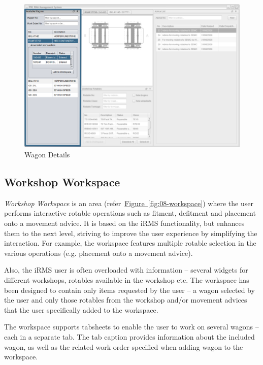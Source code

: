 \begin{figure}[!h]
\centering
\includegraphics[scale=0.37]{chapters/01-user-interface/images/03-available-wagons-expanded.png}
\caption{Wagon Details}\label{fig:03-available-wagons-expanded}
\end{figure}

\clearpage

\subsection{Workshop Workspace}

\emph{Workshop Workspace} is an area (refer~\hyperref[fig:08-workspace]{Figure~\ref*{fig:08-workspace}}) where the user performs interactive rotable operations such as fitment, defitment and placement onto a movement advice. It is based on the iRMS functionality, but enhances them to the next level, striving to improve the user experience by simplifying the interaction. For example, the workspace features multiple rotable selection in the various operations (e.g. placement onto a movement advice).

Also, the iRMS user is often overloaded with information -- several widgets for different workshops, rotables available in the workshop etc. The workspace has been designed to contain only items requested by the user -- a wagon selected by the user and only those rotables from the workshop and/or movement advices that the user specifically added to the workspace.

The workspace supports tabsheets to enable the user to work on several wagons -- each in a separate tab. The tab caption provides information about the included wagon, as well as the related work order specified when adding wagon to the workspace.

